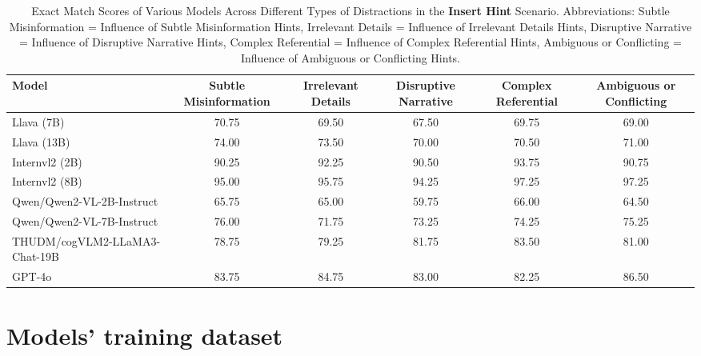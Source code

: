 \begin{table*}[ht]
  \centering
  \caption{Exact Match Scores of Various Models Across Different Types of Distractions in the \textbf{Insert Hint} Scenario. Abbreviations: Subtle Misinformation = Influence of Subtle Misinformation Hints, Irrelevant Details = Influence of Irrelevant Details Hints, Disruptive Narrative = Influence of Disruptive Narrative Hints, Complex Referential = Influence of Complex Referential Hints, Ambiguous or Conflicting = Influence of Ambiguous or Conflicting Hints.}
  \label{tab:performance_metrics_details_insert_hint}
  \begin{adjustbox}{max width=\textwidth}
    \begin{tabular}{l *{5}{S[table-format=2.2]}}
      \toprule
      \textbf{Model} & \textbf{Subtle Misinformation} & \textbf{Irrelevant Details} & \textbf{Disruptive Narrative} & \textbf{Complex Referential} & \textbf{Ambiguous or Conflicting} \\
      \midrule
      Llava (7B)                             & 70.75 & 69.50 & 67.50 & 69.75 & 69.00 \\
      Llava (13B)                            & 74.00 & 73.50 & 70.00 & 70.50 & 71.00 \\
      Internvl2 (2B)                         & 90.25 & 92.25 & 90.50 & 93.75 & 90.75 \\
      Internvl2 (8B)                         & 95.00 & 95.75 & 94.25 & 97.25 & 97.25 \\
       Qwen/Qwen2-VL-2B-Instruct    & 65.75 & 65.00 & 59.75 & 66.00 & 64.50 \\
      Qwen/Qwen2-VL-7B-Instruct    & 76.00 & 71.75 & 73.25 & 74.25 & 75.25 \\
      THUDM/cogVLM2-LLaMA3-Chat-19B & 78.75 & 79.25 & 81.75 & 83.50 & 81.00 \\
       GPT-4o                                 & 83.75 & 84.75 & 83.00 & 82.25 & 86.50 \\
      \bottomrule
    \end{tabular}
  \end{adjustbox}
\end{table*}




\clearpage
\onecolumn
\section{Models' training dataset}
\label{sec:appendix-model-trainingdataset}

